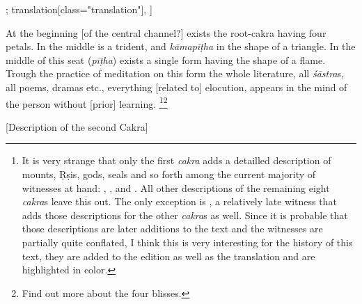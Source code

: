 \documentclass[12pt]{article}%
\def\om{\textrm{\footnotesize \textit{omitted in}\ }} %
\begin{document}
\begin{alignment}[
    texts=edition[class="edition"];
    translation[class="translation"],
  ]
\begin{translation}
 \begin{tlate}At the beginning [of the central channel?] exists the root-cakra having four petals.  In the middle is a trident, and \textit {kāmapīṭha} in the shape of a triangle. In the middle of this seat (\textit{pīṭha}) exists a single form having the shape of a flame. Trough the practice of meditation on this form the whole literature, all \textit{śāstra}s, all poems, dramas etc., everything [related to] elocution, appears in the mind of the person without [prior] learning. \footnote{It is very strange that only the first \textit{cakra} adds a detailled description of mounts, Ṛṣis, gods, seals and so forth among the current majority of witnesses at hand: , ,  and . All other descriptions of the remaining eight \textit{cakra}s leave this out. The only exception is , a relatively late witness that adds those descriptions for the other \textit{cakra}s as well. Since it is probable that those descriptions are later additions to the text and the witnesses are partially quite conflated, I think this is very interesting for the history of this text, they are added to the edition as well as the translation and are highlighted in color.}\footnote{Find out more about the four blisses.} \end{tlate}
   \end{translation}
   \begin{edition}
     \bigskip
    \centerline{\textrm{\small{[Description of the second Cakra]}}}
    \bigskip
    \begin{prose}

\end{prose}
\end{edition}
\end{alignment}
\end{document}
